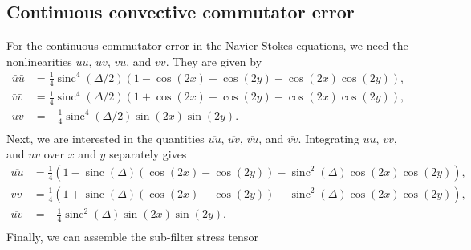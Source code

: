 \documentclass[preprint]{elsarticle}
\newcommand{\sinc}{\operatorname{sinc}}
\begin{document}
\subsection{Continuous convective commutator error}

For the continuous commutator error in the Navier-Stokes equations,
we need the nonlinearities
$\bar{u} \bar{u}$, $\bar{u} \bar{v}$, $\bar{v} \bar{u}$, and $\bar{v} \bar{v}$.
They are given by
\begin{equation}
    \begin{split}
        \bar{u} \bar{u}
        & = \frac{1}{4} \sinc^4(\Delta / 2) (1 - \cos(2 x) + \cos(2 y) - \cos(2 x) \cos(2 y)) , \\
        \bar{v} \bar{v}
        & = \frac{1}{4} \sinc^4(\Delta / 2) (1 + \cos(2 x) - \cos(2 y) - \cos(2 x) \cos(2 y)) , \\
        \bar{u} \bar{v}
        & = - \frac{1}{4} \sinc^4(\Delta / 2) \sin(2 x) \sin(2 y) . \\
    \end{split}
\end{equation}
Next, we are interested in the quantities
$\overline{u u}$, $\overline{u v}$, $\overline{v u}$, and $\overline{v v}$.
Integrating $u u$, $v v$, and $u v$ over $x$ and $y$ separately gives
\begin{equation}
    \begin{split}
        \overline{u u}
        & = \frac{1}{4} (1 - \sinc(\Delta)(\cos(2 x) - \cos(2 y)) - \sinc^2(\Delta) \cos(2x) \cos(2 y)) , \\
        \overline{v v}
        & = \frac{1}{4} (1 + \sinc(\Delta)(\cos(2 x) - \cos(2 y)) - \sinc^2(\Delta) \cos(2x) \cos(2 y)) , \\
        \overline{u v}
        & = - \frac{1}{4} \sinc^2(\Delta) \sin(2 x) \sin(2 y) . \\
    \end{split}
\end{equation}
Finally, we can assemble the sub-filter stress tensor
\end{document}
